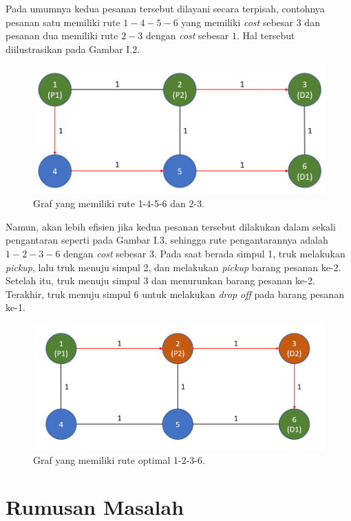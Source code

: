 Pada umumnya kedua pesanan tersebut dilayani secara terpisah, contohnya pesanan satu 
memiliki rute $1-4-5-6$ yang memiliki \textit{cost} sebesar $3$ dan pesanan dua memiliki 
rute $2-3$ dengan \textit{cost} sebesar $1$. Hal tersebut diilustrasikan pada Gambar I.2.

\begin{figure}[H]
    \centering
    \includegraphics[width=1.0\textwidth]{resources/graph_routes.png}
    \caption{Graf yang memiliki rute 1-4-5-6 dan 2-3.}
\end{figure}

Namun, akan lebih efisien jika kedua pesanan tersebut dilakukan dalam sekali pengantaran 
seperti pada Gambar I.3, sehingga rute pengantarannya adalah $1-2-3-6$ dengan \textit{cost} 
sebesar $3$. Pada saat berada simpul 1, truk melakukan \textit{pickup}, lalu truk menuju 
simpul 2, dan melakukan \textit{pickup} barang pesanan ke-2. Setelah itu, truk menuju simpul 3 
dan menurunkan barang pesanan ke-2. Terakhir, truk menuju simpul 6  untuk melakukan 
\textit{drop off} pada barang pesanan ke-1.

\begin{figure}[H]
    \centering
    \includegraphics[width=1.0\textwidth]{resources/graph_optimal.png}
    \caption{Graf yang memiliki rute optimal 1-2-3-6.}
\end{figure}

\section{Rumusan Masalah}

